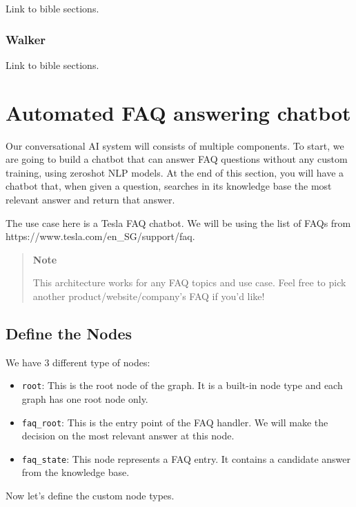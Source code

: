 Link to bible sections.

\subsubsection{Walker}\label{walker}

Link to bible sections.

\section{Automated FAQ answering
chatbot}\label{automated-faq-answering-chatbot}

Our conversational AI system will consists of multiple components. To
start, we are going to build a chatbot that can answer FAQ questions
without any custom training, using zeroshot NLP models. At the end of
this section, you will have a chatbot that, when given a question,
searches in its knowledge base the most relevant answer and return that
answer.

The use case here is a Tesla FAQ chatbot. We will be using the list of
FAQs from https://www.tesla.com/en\_SG/support/faq.

\begin{quote}
\textbf{Note}

This architecture works for any FAQ topics and use case. Feel free to
pick another product/website/company's FAQ if you'd like!
\end{quote}

\subsection{Define the Nodes}\label{define-the-nodes}

We have 3 different type of nodes:

\begin{itemize}
\tightlist
\item
  \lstinline!root!: This is the root node of the graph. It is a built-in
  node type and each graph has one root node only.
\item
  \lstinline!faq_root!: This is the entry point of the FAQ handler. We
  will make the decision on the most relevant answer at this node.
\item
  \lstinline!faq_state!: This node represents a FAQ entry. It contains a
  candidate answer from the knowledge base.
\end{itemize}

Now let's define the custom node types.

